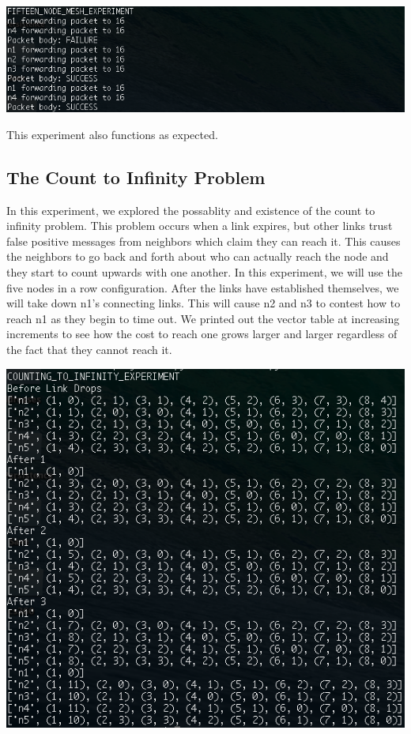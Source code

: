 \documentclass[11pt]{article}
\begin{document}
\centerline{\includegraphics[width=16cm]{fifteen_node_mesh.png}}

This experiment also functions as expected.

\subsection{The Count to Infinity Problem}

In this experiment, we explored the possablity and existence of the count to infinity problem. This problem occurs when a link expires, but other links trust false positive messages from neighbors which claim they can reach it. This causes the neighbors to go back and forth about who can actually reach the node and they start to count upwards with one another. In this experiment, we will use the five nodes in a row configuration. After the links have established themselves, we will take down n1's connecting links. This will cause n2 and n3 to contest how to reach n1 as they begin to time out. We printed out the vector table at increasing increments to see how the cost to reach one grows larger and larger regardless of the fact that they cannot reach it.

\centerline{\includegraphics[width=16cm]{count_infinity.png}}
\end{document}
